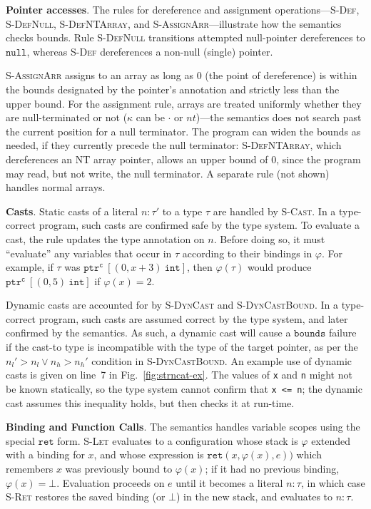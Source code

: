 \documentclass[conference]{IEEEtran}
\newcommand{\myparagraph}[1]{\textbf{#1}.\xspace}
\newcommand{\code}[1]{\lstinline|#1|}
\newcommand{\kw}[1]{\ensuremath{\mathtt{#1}}}
\newcommand{\tarray}[3]{\tarrayb{({#1},{#2})}{#3}}
\newcommand{\tarrayb}[2]{\ensuremath{[{#1}~{#2}]}}
\newcommand{\tptr}[2]{\ensuremath{\mathtt{ptr}^{#2}~{#1}}}
\newcommand{\tarrayptr}[4]{{\tptr{\tarray{#1}{#2}{#3}}{#4}}}
\newcommand{\ret}[3]{\ensuremath{\kw{ret}({#1},{#2},{#3})}}
\newcommand{\ebounds}{\ensuremath{\kw{bounds}}}
\newcommand{\enull}{\ensuremath{\kw{null}}}
\newcommand{\tint}{\ensuremath{\mathtt{int}}}
\newcommand{\erettext}{\ensuremath{\kw{ret}}}
\newcommand{\cmode}{\texttt{c}}
\begin{document}
\myparagraph{Pointer accesses}
The rules for dereference and assignment operations---\textsc{S-Def},
\textsc{S-DefNull}, \textsc{S-DefNTArray}, and
\textsc{S-AssignArr}---illustrate how the semantics checks bounds.
Rule \textsc{S-DefNull} transitions attempted null-pointer
dereferences to $\enull$, whereas \textsc{S-Def} dereferences a
non-null (single) pointer.

\textsc{S-AssignArr} assigns to an array as long as 0 (the point of
dereference) is within the bounds designated by the pointer's annotation
and strictly less than the upper bound. For the assignment rule,
arrays are treated uniformly whether they are null-terminated or not
($\kappa$ can be $\cdot$ or $nt$)---the semantics does not search past
the current position for a null terminator. The program
can widen the bounds as needed, if they currently precede the null
terminator: \textsc{S-DefNTArray}, which dereferences an NT array
pointer, allows an upper bound of $0$, since the program may read, but
not write, the null terminator. A separate rule (not shown) handles
normal arrays.

\myparagraph{Casts}
Static casts of a literal $n\!:\!\tau'$ to a type $\tau$ are handled
by \textsc{S-Cast}. In a type-correct program, such casts are
confirmed safe by the type system. To evaluate a cast, the rule
updates the type annotation on $n$. Before doing so, it must
``evaluate'' any variables that occur in $\tau$ according to their
bindings in $\varphi$. For example, if $\tau$ was
$\tarrayptr{0}{x+3}{\tint}{\cmode}$, then $\varphi(\tau)$ would
produce $\tarrayptr{0}{5}{\tint}{\cmode}$ if $\varphi(x) = 2$.

Dynamic casts are accounted for by \textsc{S-DynCast} and
\textsc{S-DynCastBound}. In a type-correct program, such casts are
assumed correct by the type system, and later confirmed by the
semantics. As such, a dynamic cast will cause a $\ebounds$ failure if
the cast-to type is incompatible with the type of the target pointer,
as per the $n_l' > n_l \vee n_h > n_h'$ condition in
\textsc{S-DynCastBound}. An example use of dynamic casts is given on
line~7 in Fig.~\ref{fig:strncat-ex}. The values of \code{x} and
\code{n} might not be known statically, so the type system cannot
confirm that \code{x <= n}; the dynamic cast assumes this inequality
holds, but then checks it at run-time.

\myparagraph{Binding and Function Calls}
The semantics handles variable scopes using the special $\erettext$
form. \textsc{S-Let} evaluates to a configuration whose stack
is $\varphi$ extended with a binding for $x$, and whose expression is
$\ret{x}{\varphi(x)}{e})$ which remembers $x$ was previously bound to
$\varphi(x)$; if it had no previous binding, $\varphi(x) =
\bot$. Evaluation proceeds on $e$ until it becomes a literal
$n\!:\!\tau$, in which case \textsc{S-Ret} restores the saved
binding (or $\bot$) in the new stack, and evaluates to
$n\!:\!\tau$. 
\end{document}
